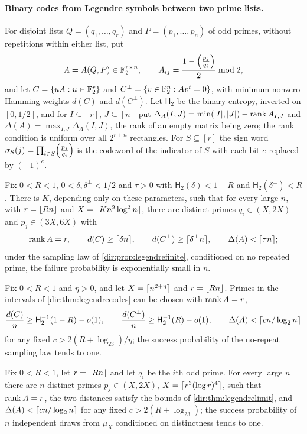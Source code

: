 \paragraph{Binary codes from Legendre symbols between two prime lists.}
For disjoint lists $Q=(q_1,\dots,q_r)$ and $P=(p_1,\dots,p_n)$ of odd primes, without repetitions within either
list, put
\[
 A=A(Q,P)\in\mathbb{F}_2^{r\times n},\qquad A_{ij}=\frac{1-\Bigl(\frac{p_j}{q_i}\Bigr)}2\bmod2,
\]
and let $C=\{uA:u\in\mathbb{F}_2^r\}$ and $C^\perp=\{v\in\mathbb{F}_2^n:Av^t=0\}$, with minimum nonzero Hamming weights
$d(C)$ and $d(C^\perp)$. Let $\mathsf H_2$ be the binary entropy, inverted on $[0,1/2]$, and for $I\subseteq[r]$,
$J\subseteq[n]$ put $\Delta_A(I,J)=\min(\lvert I\rvert,\lvert J\rvert)-\operatorname{rank} A_{I,J}$ and $\Delta(A)=\max_{I,J}\Delta_A(I,J)$, the
rank of an empty matrix being zero; the rank condition is uniform over all $2^{r+n}$ rectangles. For $S\subseteq[r]$
the sign word $\sigma_S(j)=\prod_{i\in S}\Bigl(\frac{p_j}{q_i}\Bigr)$ is the codeword of the indicator of $S$ with each
bit $e$ replaced by $(-1)^e$.

\begin{theorem}\label{dir:thm:legendrecodes}
Fix $0<R<1$, $0<\delta,\delta^\perp<1/2$ and $\tau>0$ with $\mathsf H_2(\delta)<1-R$ and
$\mathsf H_2(\delta^\perp)<R$. There is $K$, depending only on these parameters, such that for every large $n$,
with $r=\lfloor Rn\rfloor$ and $X=\lceil Kn^2\log^2n\rceil$, there are distinct primes $q_i\in(X,2X)$ and $p_j\in(3X,6X)$
with
\[
 \operatorname{rank} A=r,\qquad d(C)\ge\lceil\delta n\rceil,\qquad d(C^\perp)\ge\lceil\delta^\perp n\rceil,\qquad\Delta(A)<\lceil\tau n\rceil;
\]
under the sampling law of \cref{dir:prop:legendrefinite}, conditioned on no repeated prime, the failure
probability is exponentially small in $n$.
\end{theorem}

\begin{theorem}\label{dir:thm:legendrelimit}
Fix $0<R<1$ and $\eta>0$, and let $X=\lceil n^{2+\eta}\rceil$ and $r=\lfloor Rn\rfloor$. Primes in the intervals of
\cref{dir:thm:legendrecodes} can be chosen with $\operatorname{rank} A=r$,
\[
 \frac{d(C)}n\ge\mathsf H_2^{-1}(1-R)-o(1),\qquad\frac{d(C^\perp)}n\ge\mathsf H_2^{-1}(R)-o(1),\qquad
 \Delta(A)<\lceil cn/\log_2n\rceil
\]
for any fixed $c>2(R+\log_23)/\eta$; the success probability of the no-repeat sampling law tends to one.
\end{theorem}

\begin{theorem}\label{dir:thm:legendreprefix}
Fix $0<R<1$, let $r=\lfloor Rn\rfloor$ and let $q_i$ be the $i$th odd prime. For every large $n$ there are $n$ distinct
primes $p_j\in(X,2X)$, $X=\lceil r^3(\log r)^4\rceil$, such that $\operatorname{rank} A=r$, the two distances satisfy the bounds of
\cref{dir:thm:legendrelimit}, and $\Delta(A)<\lceil cn/\log_2n\rceil$ for any fixed $c>2(R+\log_23)$; the success
probability of $n$ independent draws from $\mu_X$ conditioned on distinctness tends to one.
\end{theorem}

